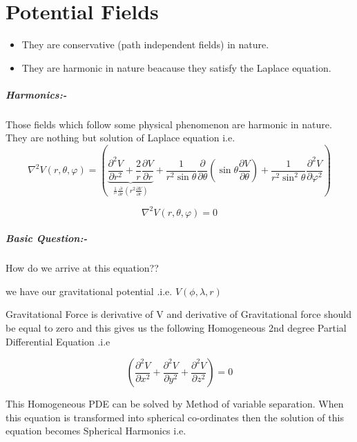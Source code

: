 \documentclass[a4paper,12pt]{report}
\begin{document}
\chapter{Potential Fields}
\begin{itemize}
\item They are conservative (path independent fields) in nature.     
\item They are harmonic in nature beacause they satisfy the Laplace equation.
\end{itemize}
\paragraph{Harmonics:-} Those fields which follow some physical phenomenon are harmonic in nature. They are nothing but solution of Laplace equation i.e.
\begin {equation}
\nabla ^2V(r,\theta ,\varphi) = \left( {\underbrace {\frac{\partial ^2V }{\partial r^2} +
\frac{2}{r}\frac{\partial V }{\partial
r}}_{\frac{1}{^{r^2}}\frac{\partial }{\partial r}\left( {r^2\frac{\partial
V }{\partial r}} \right)} + \frac{1}{r^2\sin \theta }\frac{\partial
}{\partial \theta }\left( {\sin \theta \frac{\partial V }{\partial \theta
}} \right) + \frac{1}{r^2\sin ^2\theta }\frac{\partial ^2V }{\partial
\varphi ^2}} \right)
\end{equation}

\begin {equation}
\nabla ^2V(r,\theta ,\varphi) = 0
\end{equation}

\paragraph{Basic Question:-} How do we arrive at this equation??

we have our gravitational potential .i.e. $V(\phi,\lambda,r)$

Gravitational Force is derivative of V and derivative of Gravitational force should be equal to zero and this gives us the following Homogeneous 2nd degree Partial Differential Equation .i.e

   \[ \left( \frac{\partial^2 V}{\partial x^2}
      + \frac{\partial^2 V}{\partial y^2}
      + \frac{\partial^2 V}{\partial z^2} \right)=0 \]

This Homogeneous PDE  can be solved by Method of variable separation. When this equation is transformed into spherical co-ordinates then the solution of this equation becomes Spherical Harmonics i.e.
\end{document}
